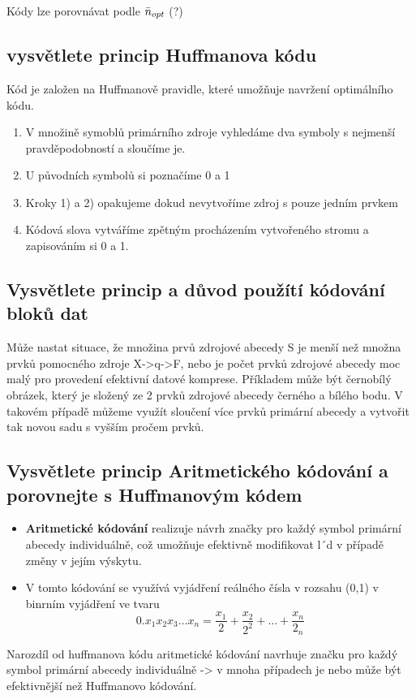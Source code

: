 Kódy lze porovnávat podle $\Bar{n}_{opt}$ (?)

\subsection{vysvětlete princip Huffmanova kódu}
Kód je založen na Huffmanově pravidle, které umožňuje navržení optimálního kódu.

\begin{enumerate}
    \item V množině symoblů primárního zdroje vyhledáme dva symboly s nejmenší pravděpodobností a sloučíme je.
    \item U původních symbolů si poznačíme 0 a 1
    \item Kroky 1) a 2) opakujeme dokud nevytvoříme zdroj s pouze jedním prvkem
    \item Kódová slova vytváříme zpětným procházením vytvořeného stromu a zapisováním si 0 a 1.
\end{enumerate}

\subsection{Vysvětlete princip a důvod použítí kódování bloků dat}
Může nastat situace, že množina prvů zdrojové abecedy S je menší než množna prvků pomocného zdroje X->q->F, nebo je počet prvků zdrojové abecedy moc malý pro provedení efektivní datové komprese.
Příkladem může být černobílý obrázek, který je složený ze 2 prvků zdrojové abecedy černého a bílého bodu.
V takovém případě můžeme využít sloučení více prvků primární abecedy a vytvořit tak novou sadu s vyšším pročem prvků.

\subsection{Vysvětlete princip Aritmetického kódování a porovnejte s Huffmanovým kódem}
\begin{itemize}
    \item \textbf{Aritmetické kódování} realizuje návrh značky pro každý symbol primární abecedy individuálně, což umožňuje efektivně modifikovat l´d v případě změny v jejím výskytu.
    \item V tomto kódování se využívá vyjádření reálného čísla v rozsahu (0,1) v binrním vyjádření ve tvaru
    $$0.x_1x_2x_3\dots x_n=\frac{x_1}{2}+\frac{x_2}{2^2}+\dots+\frac{x_n}{2_n}$$
\end{itemize}
Narozdíl od huffmanova kódu aritmetické kódování navrhuje značku pro každý symbol primární abecedy individuálně -> v mnoha případech je nebo může být efektivnější než Huffmanovo kódování.
